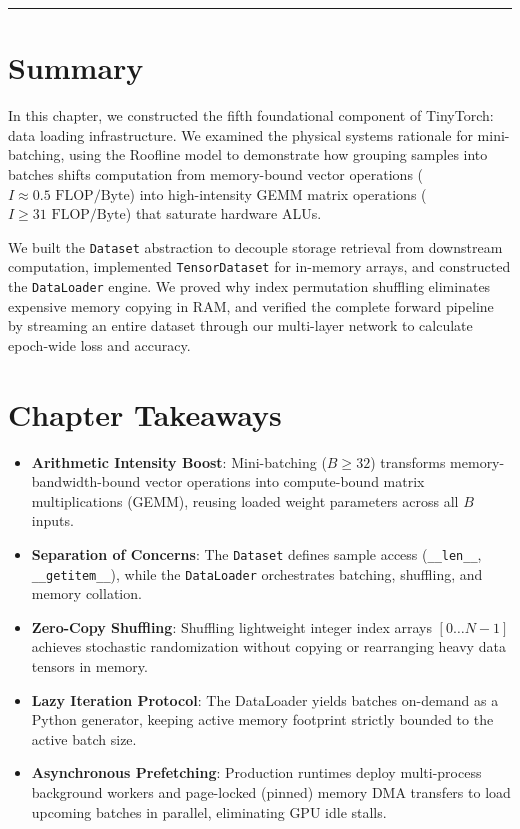 \documentclass[
  letterpaper,
]{scrbook}
\providecommand{\tightlist}{%
  \setlength{\itemsep}{0pt}\setlength{\parskip}{0pt}}
\begin{document}

\begin{center}\rule{0.5\linewidth}{0.5pt}\end{center}

\section{Summary}\label{summary-5}

In this chapter, we constructed the fifth foundational component of
TinyTorch: data loading infrastructure. We examined the physical systems
rationale for mini-batching, using the Roofline model to demonstrate how
grouping samples into batches shifts computation from memory-bound
vector operations (\(I \approx 0.5\text{ FLOP/Byte}\)) into
high-intensity GEMM matrix operations (\(I \ge 31\text{ FLOP/Byte}\))
that saturate hardware ALUs.

We built the \texttt{Dataset} abstraction to decouple storage retrieval
from downstream computation, implemented \texttt{TensorDataset} for
in-memory arrays, and constructed the \texttt{DataLoader} engine. We
proved why index permutation shuffling eliminates expensive memory
copying in RAM, and verified the complete forward pipeline by streaming
an entire dataset through our multi-layer network to calculate
epoch-wide loss and accuracy.

\section{Chapter Takeaways}\label{chapter-takeaways-5}

\begin{itemize}
\tightlist
\item
  \textbf{Arithmetic Intensity Boost}: Mini-batching (\(B \ge 32\))
  transforms memory-bandwidth-bound vector operations into compute-bound
  matrix multiplications (GEMM), reusing loaded weight parameters across
  all \(B\) inputs.
\item
  \textbf{Separation of Concerns}: The \texttt{Dataset} defines sample
  access (\texttt{\_\_len\_\_}, \texttt{\_\_getitem\_\_}), while the
  \texttt{DataLoader} orchestrates batching, shuffling, and memory
  collation.
\item
  \textbf{Zero-Copy Shuffling}: Shuffling lightweight integer index
  arrays \([0\dots N-1]\) achieves stochastic randomization without
  copying or rearranging heavy data tensors in memory.
\item
  \textbf{Lazy Iteration Protocol}: The DataLoader yields batches
  on-demand as a Python generator, keeping active memory footprint
  strictly bounded to the active batch size.
\item
  \textbf{Asynchronous Prefetching}: Production runtimes deploy
  multi-process background workers and page-locked (pinned) memory DMA
  transfers to load upcoming batches in parallel, eliminating GPU idle
  stalls.
\end{itemize}
\end{document}
